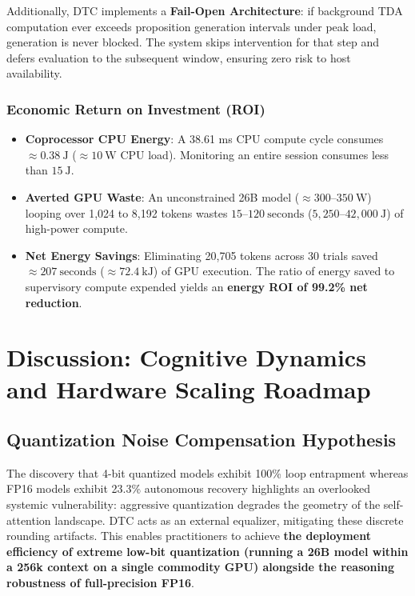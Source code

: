 \documentclass[11pt,a4paper]{article}
\begin{document}
Additionally, DTC implements a \textbf{Fail-Open Architecture}: if background TDA computation ever exceeds proposition generation intervals under peak load, generation is never blocked. The system skips intervention for that step and defers evaluation to the subsequent window, ensuring zero risk to host availability.

\subsubsection{Economic Return on Investment (ROI)}
\begin{itemize}
    \item \textbf{Coprocessor CPU Energy}: A 38.61 ms CPU compute cycle consumes $\approx 0.38\ \mathrm{J}$ ($\approx 10\ \mathrm{W}$ CPU load). Monitoring an entire session consumes less than $15\ \mathrm{J}$.
    \item \textbf{Averted GPU Waste}: An unconstrained 26B model ($\approx 300\text{--}350\ \mathrm{W}$) looping over 1,024 to 8,192 tokens wastes $15\text{--}120\ \mathrm{seconds}$ ($5,250\text{--}42,000\ \mathrm{J}$) of high-power compute.
    \item \textbf{Net Energy Savings}: Eliminating 20,705 tokens across 30 trials saved $\approx 207\ \mathrm{seconds}$ ($\approx 72.4\ \mathrm{kJ}$) of GPU execution. The ratio of energy saved to supervisory compute expended yields an \textbf{energy ROI of 99.2\% net reduction}.
\end{itemize}

\section{Discussion: Cognitive Dynamics and Hardware Scaling Roadmap}

\subsection{Quantization Noise Compensation Hypothesis}
The discovery that 4-bit quantized models exhibit 100\% loop entrapment whereas FP16 models exhibit 23.3\% autonomous recovery highlights an overlooked systemic vulnerability: aggressive quantization degrades the geometry of the self-attention landscape. DTC acts as an external equalizer, mitigating these discrete rounding artifacts. This enables practitioners to achieve \textbf{the deployment efficiency of extreme low-bit quantization (running a 26B model within a 256k context on a single commodity GPU) alongside the reasoning robustness of full-precision FP16}.
\end{document}
